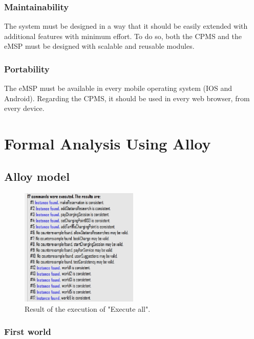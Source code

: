 \documentclass{Configuration_Files/PoliMi3i_thesis}
\begin{document}
\subsection{Maintainability}

The system must be designed in a way that it should be easily extended with additional features with minimum effort. To do so, both the CPMS and the eMSP must be designed with scalable and reusable modules.

\subsection{Portability}

The eMSP must be available in every mobile operating system (IOS and Android). Regarding the CPMS, it should be used in every web browser, from every device.

\chapter{Formal Analysis Using Alloy}

\section{Alloy model}



\begin{figure}[H]
    \centering
    \includegraphics[width=0.5\textwidth]{Images/alloy/consistency.jpg}
    \caption{Result of the execution of "Execute all".}
    \label{fig:alloy-res-consistency}
\end{figure}

\newpage

\subsection{First world}
\end{document}
